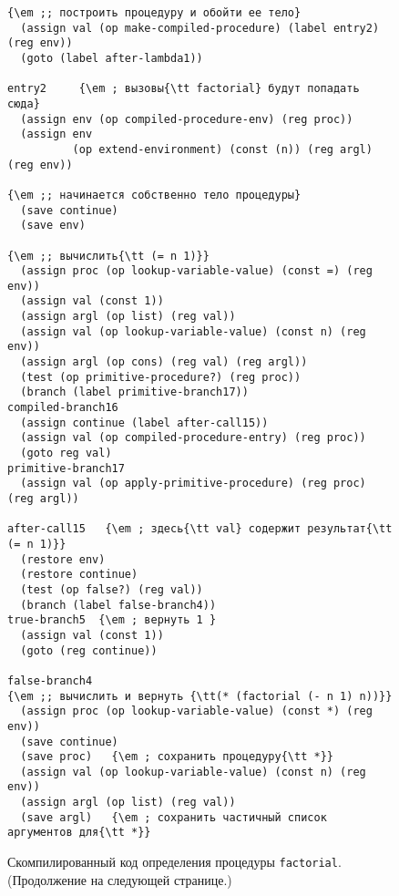 \begin{figure}[p]
\begin{Verbatim}[fontsize=\small]
{\em ;; построить процедуру и обойти ее тело}
  (assign val (op make-compiled-procedure) (label entry2) (reg env))
  (goto (label after-lambda1))

entry2     {\em ; вызовы{\tt factorial} будут попадать сюда}
  (assign env (op compiled-procedure-env) (reg proc))
  (assign env 
          (op extend-environment) (const (n)) (reg argl) (reg env))

{\em ;; начинается собственно тело процедуры}
  (save continue)
  (save env)

{\em ;; вычислить{\tt (= n 1)}}
  (assign proc (op lookup-variable-value) (const =) (reg env))
  (assign val (const 1))
  (assign argl (op list) (reg val))
  (assign val (op lookup-variable-value) (const n) (reg env))
  (assign argl (op cons) (reg val) (reg argl))
  (test (op primitive-procedure?) (reg proc))
  (branch (label primitive-branch17))
compiled-branch16
  (assign continue (label after-call15))
  (assign val (op compiled-procedure-entry) (reg proc))
  (goto reg val)
primitive-branch17
  (assign val (op apply-primitive-procedure) (reg proc) (reg argl))

after-call15   {\em ; здесь{\tt val} содержит результат{\tt (= n 1)}}
  (restore env)
  (restore continue)
  (test (op false?) (reg val))
  (branch (label false-branch4))
true-branch5  {\em ; вернуть 1 }
  (assign val (const 1))
  (goto (reg continue))

false-branch4
{\em ;; вычислить и вернуть {\tt(* (factorial (- n 1) n))}}
  (assign proc (op lookup-variable-value) (const *) (reg env))
  (save continue)
  (save proc)   {\em ; сохранить процедуру{\tt *}}
  (assign val (op lookup-variable-value) (const n) (reg env))
  (assign argl (op list) (reg val))
  (save argl)   {\em ; сохранить частичный список аргументов для{\tt *}}
\end{Verbatim}
\caption{Скомпилированный код определения процедуры {\tt factorial}. 
(Продолжение на следующей странице.)}
\addtocounter{figure}{-1}
\end{figure}
